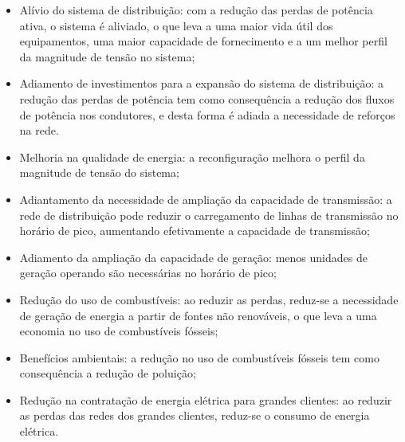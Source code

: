 \begin{itemize}
    \item Alívio do sistema de distribuição: com a redução das perdas de potência ativa, o sistema é aliviado, o que leva a uma maior vida útil dos equipamentos, uma maior capacidade de fornecimento e a um melhor perfil da magnitude de tensão no sistema;
    
    \item Adiamento de investimentos para a expansão do sistema de distribuição: a redução das perdas de potência tem como consequência a redução dos fluxos de potência nos condutores, e desta forma é adiada a necessidade de reforços na rede.
    
    \item Melhoria na qualidade de energia: a reconfiguração melhora o perfil da magnitude de tensão do sistema;
    
    \item Adiantamento da necessidade de ampliação da capacidade de transmissão: a rede de distribuição pode reduzir o carregamento de linhas de transmissão no horário de pico, aumentando efetivamente a capacidade de transmissão;
    
    \item Adiamento da ampliação da capacidade de geração: menos unidades de geração operando são necessárias no horário de pico;
    
    \item Redução do uso de combustíveis: ao reduzir as perdas, reduz-se a necessidade de geração de energia a partir de fontes não renováveis, o que leva a uma economia no uso de combustíveis fósseis;
    
    \item Benefícios ambientais: a redução no uso de combustíveis fósseis tem como consequência a redução de poluição;
    
    \item Redução na contratação de energia elétrica para grandes clientes: ao reduzir as perdas das redes dos grandes clientes, reduz-se o consumo de energia elétrica.
\end{itemize}

